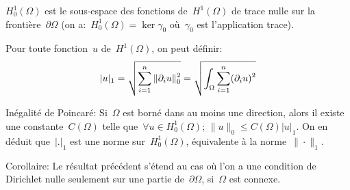 \medskip
$H^1_0(\Omega)$ est le sous-espace des fonctions de~$H^1(\Omega)$ de trace nulle 
sur la frontière~$\partial\Omega$ (on a:~$H^1_0(\Omega)=\ker\gamma_0$ où~$\gamma_0$
est l'application trace).

\medskip
Pour toute fonction~$u$ de~$H^1(\Omega)$, on peut définir:
\[
|u|_1=\sqrt{\displaystyle\sum_{i=1}^n\|\partial_i u\|_ 0^2} =
\sqrt{\displaystyle\int_\Omega\displaystyle\sum_{i=1}^n (\partial_i u)^2}
\]

\medskip
Inégalité de Poincaré:
Si~$\Omega$ est borné dans au moins une direction, alors il
existe une constante~$C(\Omega)$ telle que~$\forall u\in H^1_0(\Omega)$; 
$\|u\|_0 \le C(\Omega) |u|_1$.
On en déduit que~$|.|_1$ est une norme sur~$H^1_0(\Omega)$, équivalente à 
la norme~$\|\cdot\|_1$.

\medskip
Corollaire: 
Le résultat précédent s'étend au cas où l'on a une condition de Dirichlet nulle
seulement sur une partie de~$\partial\Omega$, si~$\Omega$ est connexe.



